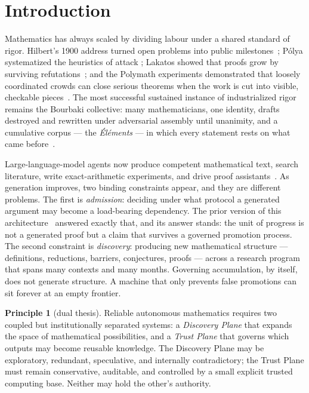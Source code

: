 \documentclass[11pt]{amsart}
\theoremstyle{definition}
\newtheorem{principle}{Principle}
\theoremstyle{remark}
\begin{document}
\maketitle

\section{Introduction}\label{sec:intro}

Mathematics has always scaled by dividing labour under a shared standard of
rigor. Hilbert's 1900 address turned open problems into public
milestones~\cite{Hilbert1900}; P\'olya systematized the heuristics of attack
\cite{Polya45}; Lakatos showed that proofs grow by surviving
refutations~\cite{Lakatos76}; and the Polymath experiments demonstrated that
loosely coordinated crowds can close serious theorems when the work is cut into
visible, checkable pieces~\cite{GowersNielsen09,Polymath12}. The most successful
sustained instance of industrialized rigor remains the Bourbaki collective:
many mathematicians, one identity, drafts destroyed and rewritten under
adversarial assembly until unanimity, and a cumulative corpus --- the
\emph{\'El\'ements} --- in which every statement rests on what came
before~\cite{Bourbaki,Mashaal06,Corry92,Weil92,Beaulieu93}.

Large-language-model agents now produce competent mathematical text, search
literature, write exact-arithmetic experiments, and drive proof
assistants~\cite{Yao23,Trinh24,RomeraParedes24,Davies21}. As generation
improves, two binding constraints appear, and they are different problems. The
first is \emph{admission}: deciding under what protocol a generated argument may
become a load-bearing dependency. The prior version of this
architecture~\cite{Lucius26} answered exactly that, and its answer stands: the
unit of progress is not a generated proof but a claim that survives a governed
promotion process. The second constraint is \emph{discovery}: producing new
mathematical structure --- definitions, reductions, barriers, conjectures,
proofs --- across a research program that spans many contexts and many months.
Governing accumulation, by itself, does not generate structure. A machine that
only prevents false promotions can sit forever at an empty frontier.

\begin{principle}[dual thesis]\label{pr:dual}
Reliable autonomous mathematics requires two coupled but institutionally
separated systems: a \emph{Discovery Plane} that expands the space of
mathematical possibilities, and a \emph{Trust Plane} that governs which outputs
may become reusable knowledge. The Discovery Plane may be exploratory,
redundant, speculative, and internally contradictory; the Trust Plane must
remain conservative, auditable, and controlled by a small explicit trusted
computing base. Neither may hold the other's authority.
\end{principle}
\end{document}
